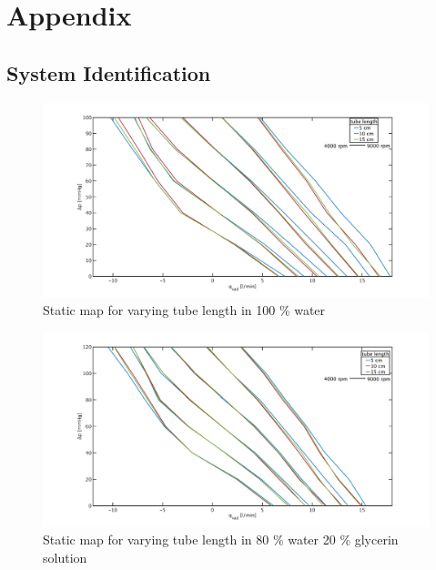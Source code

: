 \chapter{Appendix}
\section{System Identification}\label{A1}
\begin{figure}[ht]
  \includegraphics[width=\textwidth]{images/chapt_4/100w_tube_length_new.pdf}
  \caption[Static map for different tube length in 100 \% water]{Static map for varying tube length in 100 \% water}
  \label{fig:anh_1}
\end{figure}

\begin{figure}[ht]
  \includegraphics[width=\textwidth]{images/chapt_4/80w20g_tube_length_new.pdf}
  \caption[Static map for different tube length in 80 \% water 20 \% glycerin solution]{Static map for varying tube length in 80 \% water 20 \% glycerin solution}
 \label{fig:anh_2}
\end{figure}


